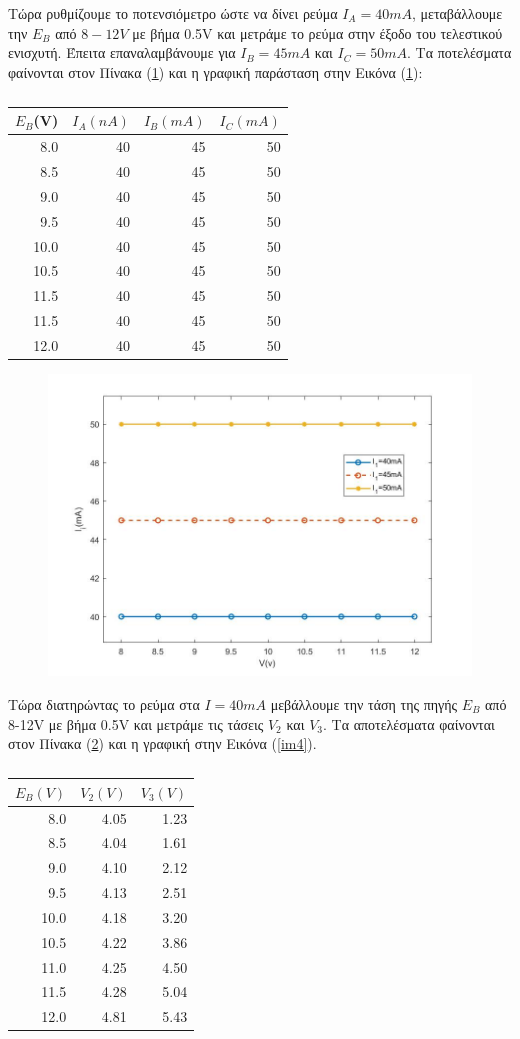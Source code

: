 \documentclass[a4paper]{article}
\begin{document}
		
		Τώρα ρυθμίζουμε το ποτενσιόμετρο ώστε να δίνει ρεύμα $I_A=40mA$, μεταβάλλουμε την $E_B$ από $8-12V$ με βήμα 0.5V και μετράμε το ρεύμα στην έξοδο του τελεστικού ενισχυτή. Έπειτα επαναλαμβάνουμε για $I_B=45mA$ και $I_C = 50mA$. Τα ποτελέσματα φαίνονται στον Πίνακα (\ref{mat2}) και η γραφική παράσταση στην Εικόνα (\ref{im3}): 
		\begin{table}[h!]
			\centering
			\begin{tabular}{r|r|r|r}
				$E_B$(V) & $I_A(nA)$ & $I_B(mA)$ & $I_C(mA)$ \\\hline\hline
				8.0&40&45&50\\
				8.5&40&45&50\\
				9.0&40&45&50\\
				9.5&40&45&50\\
				10.0&40&45&50\\
				10.5&40&45&50\\
				11.5&40&45&50\\
				11.5&40&45&50\\
				12.0&40&45&50
			\end{tabular}
			\caption{ }
			\label{mat2}
		\end{table}
		 
		 
		 \begin{figure}[h!]
		 	\centering
		 	\includegraphics[width=0.7\linewidth]{plot2.jpg}
		 	\caption{ }
		 	\label{im3}
		 \end{figure}
		 
		 Τώρα διατηρώντας το ρεύμα στα $I=40mA$ μεβάλλουμε την τάση της πηγής $E_B$ από 8-12V με βήμα 0.5V και μετράμε τις τάσεις $V_2$ και $V_3$. Τα αποτελέσματα φαίνονται στον Πίνακα (\ref{mat3}) και η γραφική στην Εικόνα (\ref{im4}).
		 \begin{table}[h!]
		 	\centering
		 	\begin{tabular}{r|r|r}
		 		$E_B(V)$ & $V_2(V)$ & $V_3(V)$ \\\hline\hline
		 		8.0&4.05&1.23 \\
				8.5&4.04&1.61\\
				9.0&4.10&2.12\\
				9.5&4.13&2.51\\
				10.0&4.18&3.20\\
				10.5&4.22&3.86\\
				11.0&4.25&4.50\\
				11.5&4.28&5.04\\
				12.0&4.81&5.43		 	
		 	\end{tabular}
		 	\caption{ }
		 	\label{mat3}
		 \end{table}
		 
\end{document}
